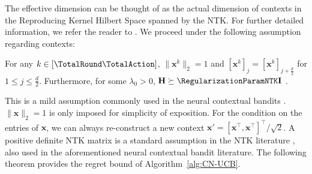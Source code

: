 \documentclass{article}
\theoremstyle{plain}
\begin{document}
%
The effective dimension can be thought of as the actual dimension of contexts in the Reproducing Kernel Hilbert Space spanned by the NTK. 
For further detailed information, we refer the reader to \citet{jacot2018ntk}. We proceed under the following assumption regarding  contexts:%
\begin{assumption}\label{assum:context}
 For any $k \in [\TotalRound \TotalAction]$, $\| \mathbf{x}^k \|_2 = 1$ and 
$[\mathbf{x}^k]_j = [\mathbf{x}^k]_{j+\frac{d}{2}} $ for $1 \le j \le \frac{d}{2}$.
Furthermore, for some $\lambda_0 > 0 $, $\mathbf{H} \succeq \RegularizationParamNTK \mathbf{I}$ .
\end{assumption}
%
This is a mild assumption commonly used in the neural contextual bandits \cite{zhou2020neural, zhang2021neural}. $\|\mathbf{x}\|_2 = 1$ is only imposed for simplicity of exposition. For the condition on the entries of $\mathbf{x}$, we can always re-construct a new context $\mathbf{x}' = [\mathbf{x}^\top, \mathbf{x}^\top]^\top/\sqrt{2}$. A positive definite NTK matrix is a standard assumption in the NTK literature \cite{du2018gradient, arora2019fine}, also used in the aforementioned neural contextual bandit literature. The following theorem provides the regret bound of Algorithm~\ref{alg:CN-UCB}.
%
\end{document}
